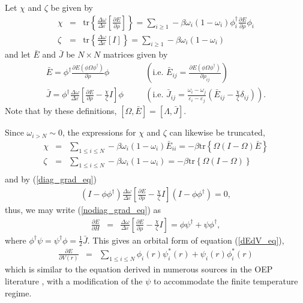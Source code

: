 \documentclass{article}
\newcommand{\beas}{\begin{eqnarray*}}
\newcommand{\enas}{\end{eqnarray*}}
\newcommand{\bea}{\begin{eqnarray}} \newcommand{\ena}{\end{eqnarray}}
\newcommand{\trace}{\mbox{tr}} \newcommand{\real}{\mathcal Re}
\newcommand{\half}{{\frac{1}{2}}} \newcommand{\quarter}{{\frac{1}{4}}}
\begin{document}
Let $\chi$ and $\zeta$ be given by
\beas
\chi &=& \trace\left\{\frac{\Delta \omega}{\Delta \varepsilon}
               \left[\frac{\partial E}{\partial \rho}\right]\right\}
  = \sum_{i\ge 1} -\beta \omega_i (1-\omega_i)
    \phi_i^\dagger\frac{\partial E}{\partial \rho}\phi_i\\
\zeta &=& \trace\left\{\frac{\Delta \omega}{\Delta \varepsilon}\left[I\right]\right\}
  = \sum_{i\ge 1} -\beta \omega_i (1-\omega_i)
\enas
and let $\bar{E}$ and $\bar{J}$ be $N\times N$ matrices given by
\bea
\label{Ebar_def_eq}
\bar{E} =
 \phi^\dagger \frac{\partial E(\phi \Omega \phi^\dagger)}{\partial \rho} \phi
&\quad& \left( \mbox{i.e. }
\bar{E}_{ij} =
 \frac{\partial E(\phi \Omega \phi^\dagger)}{\partial \rho_{ij}}\right)
\\
\label{Jbar_def_eq}
\bar{J} =
 \phi^\dagger 
   \frac{\Delta \omega}{\Delta \varepsilon} \left[
        \frac{\partial E}{\partial \rho}
  - \frac{\chi}{\zeta} I
   \right]
   \phi
&\quad& \left( \mbox{i.e. }
\bar{J}_{ij} =
 \frac{\omega_i - \omega_j}{\varepsilon_i - \varepsilon_j} 
  \left(\bar{E}_{ij} - \frac{\chi}{\zeta}\delta_{ij}\right)
\right).
\ena
Note that by these definitions,
$\left[\Omega,\bar{E}\right] = \left[\Lambda,\bar{J}\right]$.

Since $\omega_{i>N} \sim 0$, the expressions for $\chi$ and
$\zeta$ can likewise be truncated,
\beas
\chi &=& \sum_{1\le i \le N} -\beta \omega_i (1-\omega_i) \bar{E}_{ii}
      = -\beta \trace\left\{ \Omega(I-\Omega) \bar{E} \right\}\\
\zeta &=& \sum_{1\le i \le N} -\beta \omega_i (1-\omega_i)
      = -\beta \trace\left\{ \Omega(I-\Omega) \right\}\\
\enas
and by (\ref{diag_grad_eq})
\beas
(I-\phi \phi^\dagger)
   \frac{\Delta \omega}{\Delta \varepsilon} \left[
        \frac{\partial E}{\partial \rho} - \frac{\chi}{\zeta} I\right]
(I - \phi \phi^\dagger) = 0,
\enas
thus, we may write (\ref{nodiag_grad_eq}) as
\bea
\label{orb_jacE_eq}
\frac{\partial E}{\partial H} &=&
\frac{\Delta \omega}{\Delta \varepsilon} \left[
    \frac{\partial E}{\partial \rho} - \frac{\chi}{\zeta} I\right] =
  \phi \psi^\dagger + \psi \phi^\dagger,
\ena
where $\phi^\dagger \psi = \psi^\dagger \phi = \half \bar{J}$.
This gives an orbital form of equation (\ref{dEdV_eq}),
\bea
\label{new_oep_eq}
\frac{\partial E}{\partial V(r)}
     &=& \sum_{1\le i\le N} \phi_i(r) \psi_i^*(r)+\psi_i(r) \phi_i^*(r)
\ena
which is similar to the equation derived in numerous sources in the OEP
literature \cite{HymanStilesZangwill:00,KummelPerdew:03}, with a modification of the $\psi$ to
accommodate the finite temperature regime.
\end{document}
